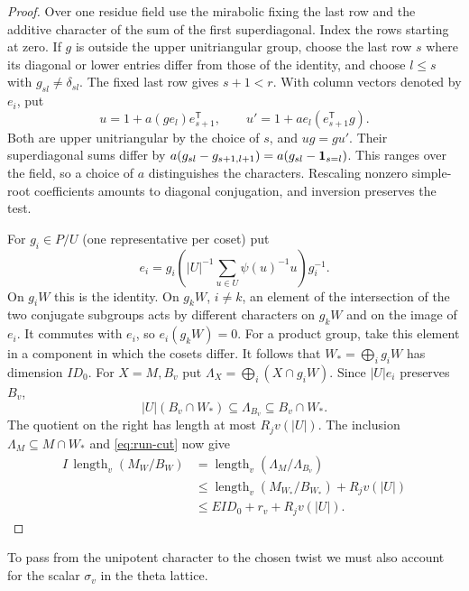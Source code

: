 \begin{proof}
Over one residue field use the mirabolic fixing the last row
and the additive character of the sum of the first superdiagonal.
Index the rows starting at zero. If
\(g\) is outside the upper unitriangular group, choose the last
row \(s\) where its diagonal or lower entries differ from those of
the identity, and choose \(l\le s\) with \(g_{sl}\ne\delta_{sl}\).
The fixed last row gives \(s+1<r\). With column vectors denoted
by \(e_i\), put
\[
 u=1+a(ge_l)e_{s+1}^{\mathsf T},\qquad
 u'=1+ae_l(e_{s+1}^{\mathsf T}g).
\]
Both are upper unitriangular by the choice of \(s\), and
\(ug=gu'\). Their superdiagonal sums differ by
\(a(g_{sl}-g_{s+1,l+1})=a(g_{sl}-{\bf1}_{s=l})\).
This ranges over the field, so a choice of \(a\) distinguishes
the characters. Rescaling nonzero simple-root coefficients
amounts to diagonal conjugation, and inversion preserves the test.

For \(g_i\in P/U\) (one representative per coset) put
\[
 e_i=g_i\left(|U|^{-1}\sum_{u\in U}\psi(u)^{-1}u\right)g_i^{-1}.
\]
On \(g_iW\) this is the identity. On \(g_kW\), \(i\ne k\), an
element of the intersection of the two conjugate subgroups acts by
different characters on \(g_kW\) and on the image of \(e_i\).
It commutes with \(e_i\), so \(e_i(g_kW)=0\). For a product
group, take this element in a component in which the cosets differ.
It follows that \(W_*=\bigoplus_i g_i W\) has dimension \(I D_0\).
For \(X=M,B_v\) put \(\Lambda_X=\bigoplus_i(X\cap g_iW)\).
Since \(|U|e_i\) preserves \(B_v\),
\[
 |U|(B_v\cap W_*)\subseteq\Lambda_{B_v}\subseteq B_v\cap W_* .
\]
The quotient on the right has length at most \(R_jv(|U|)\).
The inclusion \(\Lambda_M\subseteq M\cap W_*\) and
\eqref{eq:run-cut} now give
\[
 \begin{aligned}
 I\,\operatorname{length}_v(M_W/B_W)
 &=\operatorname{length}_v(\Lambda_M/\Lambda_{B_v})\\
 &\le \operatorname{length}_v(M_{W_*}/B_{W_*})+R_jv(|U|)\\
 &\le E I D_0+r_v+R_jv(|U|).
 \end{aligned}
\]
\label{cor:paired-row-indices-4}
\end{proof}

To pass from the unipotent character to the chosen twist we must
also account for the scalar \(\sigma_v\) in the theta lattice.



